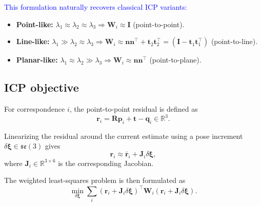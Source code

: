 \textcolor{blue}{
This formulation naturally recovers classical ICP variants:
}
\begin{itemize}
  \item \textbf{Point-like:}
  \(\lambda_1 \approx \lambda_2 \approx \lambda_3
  \Rightarrow \mathbf{W}_i \approx \mathbf{I}\) (point-to-point).
  \item \textbf{Line-like:}
  \(\lambda_1 \gg \lambda_2 \approx \lambda_3
  \Rightarrow \mathbf{W}_i \approx \mathbf{n}\mathbf{n}^\top + \mathbf{t}_2\mathbf{t}_2^\top = (\mathbf{I} - \mathbf{t}_1\mathbf{t}_1^\top)\)  (point-to-line).
  \item \textbf{Planar-like:}
  \(\lambda_1 \approx \lambda_2 \gg \lambda_3
  \Rightarrow \mathbf{W}_i \approx \mathbf{n}\mathbf{n}^\top\) (point-to-plane).
\end{itemize}



\subsection{ICP objective}

For correspondence \(i\), the point-to-point residual is defined as
\begin{equation}
\mathbf{r}_i = \mathbf{R}\mathbf{p}_i + \mathbf{t} -
\mathbf{q}_i
\in \mathbb{R}^3 .
\end{equation}

Linearizing the residual around the current estimate using a pose increment
\(\delta\bm{\xi} \in \mathfrak{se}(3)\) gives
\begin{equation}
\mathbf{r}_i \approx
\bar{\mathbf{r}}_i + \mathbf{J}_i \delta\bm{\xi},
\end{equation}
where \(\mathbf{J}_i \in \mathbb{R}^{3 \times 6}\) is the corresponding Jacobian.

The weighted least-squares problem is then formulated as
\begin{equation}
\min_{\delta\bm{\xi}}
\sum_i
\left(
\mathbf{r}_i + \mathbf{J}_i \delta\bm{\xi}
\right)^\top
\mathbf{W}_i
\left(
\mathbf{r}_i + \mathbf{J}_i \delta\bm{\xi}
\right).
\end{equation}


